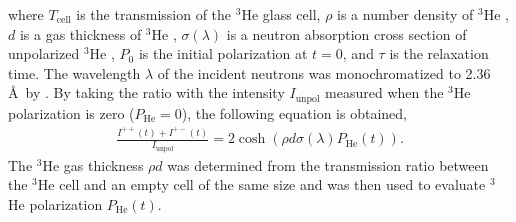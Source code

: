 \documentclass[%
 reprint,
superscriptaddress,
 amsmath,amssymb,
 aps,
]{revtex4-2}
\newcommand{\He}{$^3$He }
\begin{document}
where $T_\mathrm{cell}$ is the transmission of the \He glass cell, $\rho$ is a number density of \He, $d$ is a gas thickness of \He ,
$\sigma (\lambda)$ is a neutron absorption cross section of unpolarized \He,
$P_0$ is the initial polarization at $t=0$, and $\tau$ is the relaxation time.
The wavelength $\lambda$ of the incident neutrons was monochromatized to 2.36 \AA~by .
By taking the ratio with the intensity $I_\mathrm{unpol}$ measured when the \He polarization is zero ($P_\mathrm{He} = 0$), the following equation is obtained,
\begin{align}
    \frac{I^{++}(t)+I^{+-}(t)}{I_\mathrm{unpol}} = 2\cosh(\rho d \sigma(\lambda)P_\mathrm{He}(t)).
    \label{eq:transmission_ratio}
\end{align}
The \He gas thickness $\rho d$ was determined from the transmission ratio between the \He cell and an empty cell of the same size and was then used to evaluate \He polarization $P_\mathrm{He}(t)$.
\end{document}
